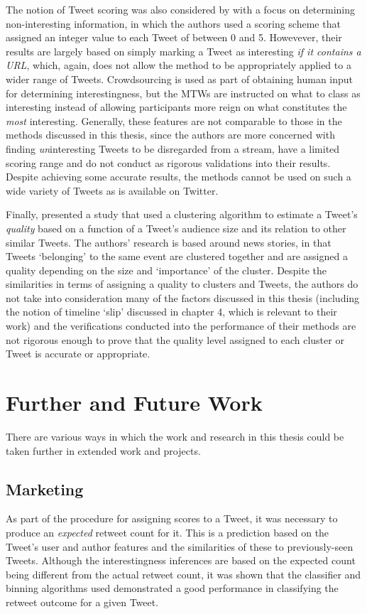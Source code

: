 The notion of Tweet scoring was also considered by \cite{alonso10} with a focus on determining non-interesting information, in which the authors used a scoring scheme that assigned an integer value to each Tweet of between 0 and 5. Howevever, their results are largely based on simply marking a Tweet as interesting \textit{if it contains a URL}, which, again, does not allow the method to be appropriately applied to a wider range of Tweets. Crowdsourcing is used as part of obtaining human input for determining interestingness, but the MTWs are instructed on what to class as interesting instead of allowing participants more reign on what constitutes the \textit{most} interesting. Generally, these features are not comparable to those in the methods discussed in this thesis, since the authors are more concerned with finding \textit{un}interesting Tweets to be disregarded from a stream, have a limited scoring range and do not conduct as rigorous validations into their results. Despite achieving some accurate results, the methods cannot be used on such a wide variety of Tweets as is available on Twitter.

Finally, \cite{lauw10} presented a study that used a clustering algorithm to estimate a Tweet's \textit{quality} based on a function of a Tweet's audience size and its relation to other similar Tweets. The authors' research is based around news stories, in that Tweets `belonging' to the same event are clustered together and are assigned a quality depending on the size and `importance' of the cluster. Despite the similarities in terms of assigning a quality to clusters and Tweets, the authors do not take into consideration many of the factors discussed in this thesis (including the notion of timeline `slip' discussed in chapter 4, which is relevant to their work) and the verifications conducted into the performance of their methods are not rigorous enough to prove that the quality level assigned to each cluster or Tweet is accurate or appropriate.


\section{Further and Future Work}
There are various ways in which the work and research in this thesis could be taken further in extended work and projects.


\subsection{Marketing}
As part of the procedure for assigning scores to a Tweet, it was necessary to produce an \textit{expected} retweet count for it. This is a prediction based on the Tweet's user and author features and the similarities of these to previously-seen Tweets. Although the interestingness inferences are based on the expected count being different from the actual retweet count, it was shown that the classifier and binning algorithms used demonstrated a good performance in classifying the retweet outcome for a given Tweet. 

